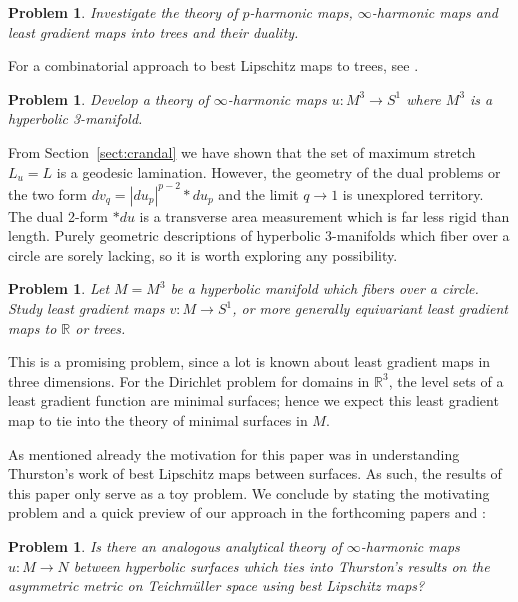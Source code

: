 \documentclass{ip-journal}
\newtheorem{problem}[theorem]{Problem}
\theoremstyle{definition}
\numberwithin{equation}{section}
\newcommand{\R}{\mathbb R}
\begin{document}
\begin{problem}\label{Conjecture 10} Investigate the theory of $p$-harmonic maps, $\infty$-harmonic maps and least gradient maps into trees and their duality. 
  \end{problem}
For a  combinatorial approach to best Lipschitz maps to trees, see \cite{naor-sheffield}. 

\begin{problem}\label{Problem 12}
 Develop a theory of $\infty$-harmonic maps  $u: M^3 \rightarrow S^1$ where $M^3$ is a hyperbolic 3-manifold.
 \end{problem}

From Section~\ref{sect:crandal} we have shown that the set of maximum stretch $L_u = L$ is a geodesic lamination. However, the geometry of the dual problems or the two form
$dv_q =|du_p|^{p-2}*du_p$ and the limit $q \rightarrow 1$ is unexplored territory. The dual 2-form $*du$ is a transverse area measurement which is far less rigid than length. Purely geometric descriptions of hyperbolic 3-manifolds which fiber over a circle are sorely lacking, so it is worth exploring any possibility. 


\begin{problem}\label{Problem 15} Let $M = M^3$ be a hyperbolic manifold which fibers over a circle. Study least gradient maps $v: M \rightarrow S^1$, or more generally equivariant  least gradient maps to $\R$ or trees.
 \end{problem}
 This is a promising problem, since a lot is known about least gradient maps in three dimensions. For the Dirichlet problem for domains in $\R^3$, the level sets of a least gradient function are minimal surfaces; hence we expect this least gradient map to tie into the theory of minimal surfaces in $M$. 
 
 As mentioned already the motivation for this paper was in understanding Thurston's work of best Lipschitz maps between surfaces. As such, the results of this paper only serve as a toy problem.  We conclude by stating the motivating problem and a quick preview of our approach in the forthcoming papers \cite{daskal-uhlen2} and \cite{daskal-uhlen3}:
 
 \begin{problem}\label{Problem 11} Is there an analogous analytical theory of $\infty$-harmonic maps $u: M \rightarrow N$ between hyperbolic surfaces which ties into Thurston's results on the asymmetric metric on Teichm\"uller space using best Lipschitz maps?
\end{problem}
 
\end{document}
